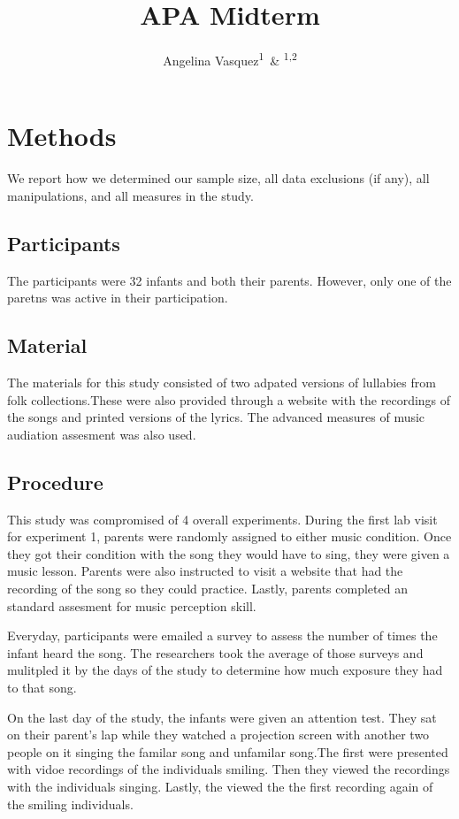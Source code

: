 \documentclass[man]{apa6}
\title{APA Midterm}
\author{Angelina Vasquez\textsuperscript{1}~\& \textsuperscript{1,2}}
\date{}
\affiliation{
\vspace{0.5cm}
\textsuperscript{1} Brooklyn College\\\textsuperscript{2} }
\begin{document}
\maketitle

\section{Methods}\label{methods}

We report how we determined our sample size, all data exclusions (if
any), all manipulations, and all measures in the study.

\subsection{Participants}\label{participants}

The participants were 32 infants and both their parents. However, only
one of the paretns was active in their participation.

\subsection{Material}\label{material}

The materials for this study consisted of two adpated versions of
lullabies from folk collections.These were also provided through a
website with the recordings of the songs and printed versions of the
lyrics. The advanced measures of music audiation assesment was also
used.

\subsection{Procedure}\label{procedure}

This study was compromised of 4 overall experiments. During the first
lab visit for experiment 1, parents were randomly assigned to either
music condition. Once they got their condition with the song they would
have to sing, they were given a music lesson. Parents were also
instructed to visit a website that had the recording of the song so they
could practice. Lastly, parents completed an standard assesment for
music perception skill.

Everyday, participants were emailed a survey to assess the number of
times the infant heard the song. The researchers took the average of
those surveys and mulitpled it by the days of the study to determine how
much exposure they had to that song.

On the last day of the study, the infants were given an attention test.
They sat on their parent's lap while they watched a projection screen
with another two people on it singing the familar song and unfamilar
song.The first were presented with vidoe recordings of the individuals
smiling. Then they viewed the recordings with the individuals singing.
Lastly, the viewed the the first recording again of the smiling
individuals.
\end{document}
